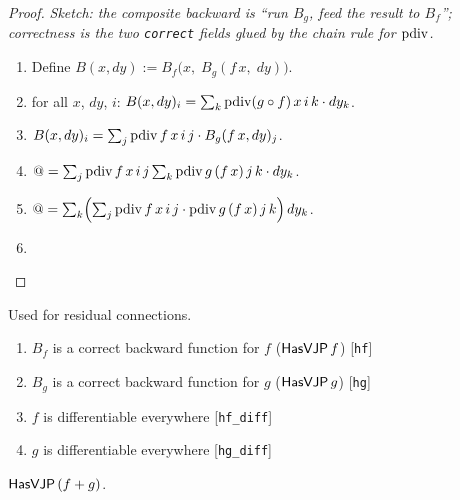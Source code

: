 \begin{proof}
\leanok
\emph{Sketch: the composite backward is ``run \(B_g\), feed the result
to \(B_f\)''; correctness is the two \texttt{correct} fields glued by
the chain rule for \(\operatorname{pdiv}\).}
\begin{enumerate}
  \item Define \(B(x, dy) := B_f\bigl(x,\; B_g(f\,x,\; dy)\bigr)\).
  \item \Suffices{} for all \(x\), \(dy\), \(i\):
    \(B(x, dy)_i = \sum_k \operatorname{pdiv}(g \circ f)\, x\, i\, k \cdot dy_k\).
  \item \(B(x, dy)_i
          = \sum_j \operatorname{pdiv} f\, x\, i\, j \cdot B_g(f\,x, dy)_j\).
  \item \(\mathord{@} = \sum_j \operatorname{pdiv} f\, x\, i\, j
          \sum_k \operatorname{pdiv} g\, (f\,x)\, j\, k \cdot dy_k\).
  \item \(\mathord{@} = \sum_k \Bigl(\sum_j \operatorname{pdiv} f\, x\, i\, j
          \cdot \operatorname{pdiv} g\, (f\,x)\, j\, k\Bigr)\, dy_k\).
  \item \Qed{}
\end{enumerate}
\end{proof}

\begin{theorem}
  \label{thm:biPathHasVJP}
  \leanok
  Used for residual connections.
  \Assume{}
  \begin{enumerate}
    \item \(B_f\) is a correct backward function for \(f\)
          (\(\mathsf{HasVJP}\, f\)) \hfill[\texttt{hf}]
    \item \(B_g\) is a correct backward function for \(g\)
          (\(\mathsf{HasVJP}\, g\)) \hfill[\texttt{hg}]
    \item \(f\) is differentiable everywhere \hfill[\texttt{hf\_diff}]
    \item \(g\) is differentiable everywhere \hfill[\texttt{hg\_diff}]
  \end{enumerate}
  \Prove{} \(\mathsf{HasVJP}\, (f + g)\).
\end{theorem}


